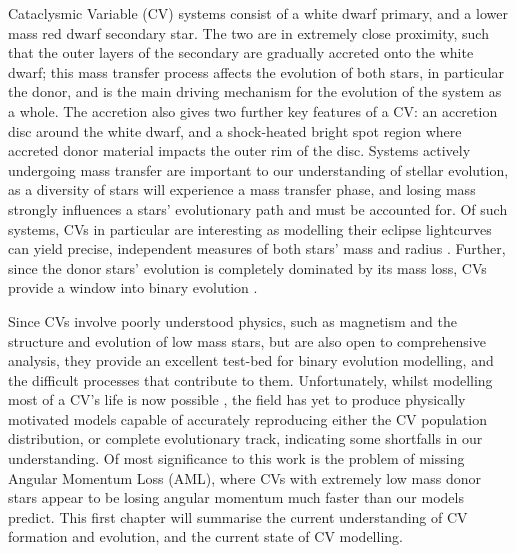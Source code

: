 
\label{chpt:introduction} %


Cataclysmic Variable (CV) systems consist of a white dwarf primary, and a lower mass red dwarf secondary star. The two are in extremely close proximity, such that the outer layers of the secondary are gradually accreted onto the white dwarf; this mass transfer process affects the evolution of both stars, in particular the donor, and is the main driving mechanism for the evolution of the system as a whole.
The accretion also gives two further key features of a CV: an accretion disc around the white dwarf, and a shock-heated bright spot region where accreted donor material impacts the outer rim of the disc.
Systems actively undergoing mass transfer are important to our understanding of stellar evolution, as a diversity of stars will experience a mass transfer phase, and losing mass strongly influences a stars' evolutionary path and must be accounted for. Of such systems, CVs in particular are interesting as modelling their eclipse lightcurves can yield precise, independent measures of both stars' mass and radius \citep{wood1986, Littlefair2008, Savoury2011}. Further, since the donor stars' evolution is completely dominated by its mass loss, CVs provide a window into binary evolution \citep{knigge2006}.

Since CVs involve poorly understood physics, such as magnetism and the structure and evolution of low mass stars, but are also open to comprehensive analysis, they provide an excellent test-bed for binary evolution modelling, and the difficult processes that contribute to them. Unfortunately, whilst modelling most of a CV's life is now possible \citep{Paxton_2015}, the field has yet to produce physically motivated models capable of accurately reproducing either the CV population distribution, or complete evolutionary track, indicating some shortfalls in our understanding. Of most significance to this work is the problem of missing Angular Momentum Loss (AML), where CVs with extremely low mass donor stars appear to be losing angular momentum much faster than our models predict. This first chapter will summarise the current understanding of CV formation and evolution, and the current state of CV modelling. 

